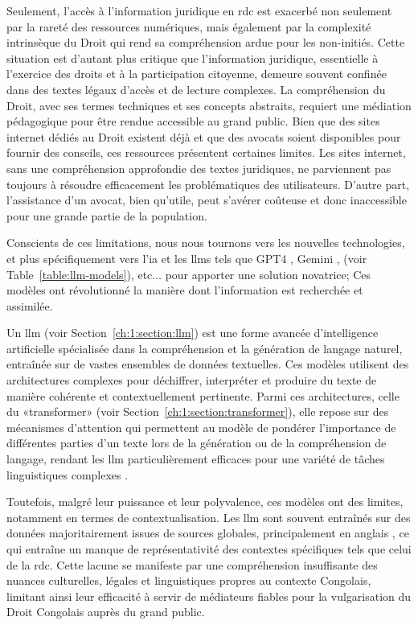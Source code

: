 Seulement, l'accès à l'information juridique en \ac{rdc} est exacerbé non seulement par la rareté des ressources numériques, mais également par la complexité intrinsèque du Droit qui rend sa compréhension ardue pour les non-initiés. Cette situation est d'autant plus critique que l'information juridique, essentielle à l'exercice des droits et à la participation citoyenne, demeure souvent confinée dans des textes légaux d'accès et de lecture complexes. La compréhension du Droit, avec ses termes techniques et ses concepts abstraits, requiert une médiation pédagogique pour être rendue accessible au grand public. Bien que des sites internet dédiés au Droit existent déjà et que des avocats soient disponibles pour fournir des conseils, ces ressources présentent certaines limites. Les sites internet, sans une compréhension approfondie des textes juridiques, ne parviennent pas toujours à résoudre efficacement les problématiques des utilisateurs. D'autre part, l'assistance d'un avocat, bien qu'utile, peut s'avérer coûteuse et donc inaccessible pour une grande partie de la population.

Conscients de ces limitations, nous nous tournons vers les nouvelles technologies, et plus spécifiquement vers l'\ac{ia} et les \acfp{llm} tels que GPT4 \cite{openai2023gpt4}, Gemini \cite{geminiteam2023gemini}, (voir Table~\ref{table:llm-models}), etc... pour apporter une solution novatrice; Ces modèles ont révolutionné la manière dont l'information est recherchée et assimilée.

Un \ac{llm} (voir Section~\ref{ch:1:section:llm}) est une forme avancée d'intelligence artificielle spécialisée dans la compréhension et la génération de langage naturel, entraînée sur de vastes ensembles de données textuelles. Ces modèles utilisent des architectures complexes pour déchiffrer, interpréter et produire du texte de manière cohérente et contextuellement pertinente. Parmi ces architectures, celle du «transformer» \cite{Rothman2022Transformers} (voir Section~\ref{ch:1:section:transformer}), elle repose sur des mécanismes d'attention qui permettent au modèle de pondérer l'importance de différentes parties d'un texte lors de la génération ou de la compréhension de langage, rendant les \ac{llm} particulièrement efficaces pour une variété de tâches linguistiques complexes \cite{vaswani2023attention}.

Toutefois, malgré leur puissance et leur polyvalence, ces modèles ont des limites, notamment en termes de contextualisation. Les \ac{llm} sont souvent entraînés sur des données majoritairement issues de sources globales, principalement en anglais \cite{zhu2024large}, ce qui entraîne un manque de représentativité des contextes spécifiques tels que celui de la \ac{rdc}. Cette lacune se manifeste par une compréhension insuffisante des nuances culturelles, légales et linguistiques propres au contexte Congolais, limitant ainsi leur efficacité à servir de médiateurs fiables pour la vulgarisation du Droit Congolais auprès du grand public.

